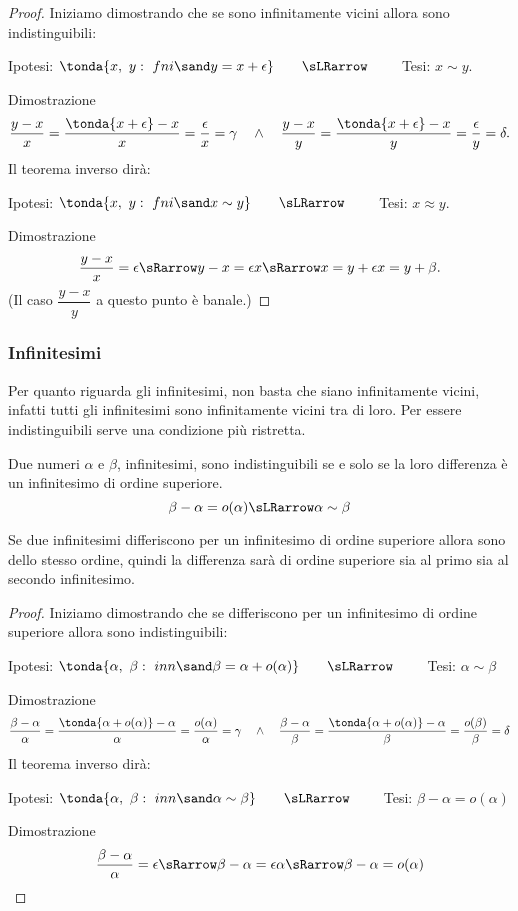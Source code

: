 \begin{proof}
Iniziamo dimostrando che se sono infinitamente vicini allora sono 
indistinguibili:
\begin{center}
Ipotesi: \(\tonda{x,~y:\ fni \sand y = x+\epsilon} \qquad \sLRarrow \qquad\) 
Tesi: \(x \sim y\).
\end{center}
Dimostrazione
\[\frac{y-x}{x}=\frac{\tonda{x+\epsilon}-x}{x} = 
\frac{\epsilon}{x}= \gamma \quad \wedge \quad 
\frac{y-x}{y}=\frac{\tonda{x+\epsilon}-x}{y} = 
\frac{\epsilon}{y}= \delta.
\]
Il teorema inverso dirà:
\begin{center}
Ipotesi: \(\tonda{x,~y:\ fni \sand x \sim y} \qquad \sLRarrow \qquad\) 
Tesi: \(x \approx y\).
\end{center}
Dimostrazione
\[\frac{y-x}{x} = \epsilon
\sRarrow y-x=\epsilon x \sRarrow x=y+\epsilon x=y+\beta. 
\]
(Il caso $\dfrac{y-x}{y}$ a questo punto è banale.)
\end{proof}

\subsubsection{Infinitesimi}
\label{subsubsec:insnum_infinitesimi}

Per quanto riguarda gli infinitesimi, non basta che siano infinitamente 
vicini, infatti tutti gli infinitesimi sono infinitamente vicini tra di loro.
Per essere indistinguibili serve una condizione più ristretta.

\begin{teorema}
Due numeri \(\alpha\) e \(\beta\), infinitesimi, 
sono indistinguibili se e solo se la loro differenza è un infinitesimo di 
ordine superiore.
\[\beta-\alpha = o(\alpha) \sLRarrow \alpha \sim \beta\] 
\end{teorema}

\begin{osservazione}
 Se due infinitesimi differiscono per un infinitesimo di ordine superiore 
allora sono dello stesso ordine, quindi la differenza sarà di ordine 
superiore sia al primo sia al secondo infinitesimo.
\end{osservazione}

\begin{proof}
Iniziamo dimostrando che se differiscono per un infinitesimo di ordine 
superiore allora sono indistinguibili:
\begin{center}
Ipotesi: \(\tonda{\alpha,~\beta:\ inn \sand \beta = \alpha +o(\alpha)}
\qquad \sLRarrow\qquad\) 
Tesi: \(\alpha \sim \beta\)
\end{center}
Dimostrazione
\[\frac{\beta-\alpha}{\alpha}=
\frac{\tonda{\alpha +o(\alpha)}-\alpha}{\alpha} = 
\frac{o(\alpha)}{\alpha}= \gamma \quad \wedge \quad 
\frac{\beta-\alpha}{\beta}=
\frac{\tonda{\alpha +o(\alpha)}-\alpha}{\beta} = 
\frac{o(\beta)}{\beta}= \delta
\]
Il teorema inverso dirà:
\begin{center}
Ipotesi: \(\tonda{\alpha,~\beta:\ inn \sand \alpha \sim \beta}
\qquad \sLRarrow \qquad\) 
Tesi: \(\beta-\alpha = o(\alpha)\)
\end{center}
Dimostrazione
\[\frac{\beta - \alpha}{\alpha} = \epsilon \sRarrow 
\beta - \alpha =\epsilon \alpha \sRarrow 
\beta - \alpha = o(\alpha)
\]
\end{proof}


